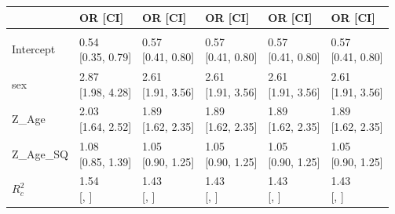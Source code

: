 \documentclass[]{article}
\begin{document}
\begin{table}[H]
\centering
\begin{tabular}{llllll}
\toprule
 & OR [CI] & OR [CI] & OR [CI] & OR [CI] & OR [CI]\\
\midrule
\addlinespace[0.3em]
\multicolumn{6}{l}{\textbf{Fixed}}\\
\hspace{1em}Intercept & \makecell{0.54 \\ {[0.35, 0.79]}} & \makecell{0.57 \\ {[0.41, 0.80]}} & \makecell{0.57 \\ {[0.41, 0.80]}} & \makecell{0.57 \\ {[0.41, 0.80]}} & \makecell{0.57 \\ {[0.41, 0.80]}}\\
\hspace{1em}sex & \makecell{2.87 \\ {[1.98, 4.28]}} & \makecell{2.61 \\ {[1.91, 3.56]}} & \makecell{2.61 \\ {[1.91, 3.56]}} & \makecell{2.61 \\ {[1.91, 3.56]}} & \makecell{2.61 \\ {[1.91, 3.56]}}\\
\hspace{1em}Z\_Age & \makecell{2.03 \\ {[1.64, 2.52]}} & \makecell{1.89 \\ {[1.62, 2.35]}} & \makecell{1.89 \\ {[1.62, 2.35]}} & \makecell{1.89 \\ {[1.62, 2.35]}} & \makecell{1.89 \\ {[1.62, 2.35]}}\\
\hspace{1em}Z\_Age\_SQ & \makecell{1.08 \\ {[0.85, 1.39]}} & \makecell{1.05 \\ {[0.90, 1.25]}} & \makecell{1.05 \\ {[0.90, 1.25]}} & \makecell{1.05 \\ {[0.90, 1.25]}} & \makecell{1.05 \\ {[0.90, 1.25]}}\\
$R^2_c$ & \makecell{1.54 \\ {[, ]}} & \makecell{1.43 \\ {[, ]}} & \makecell{1.43 \\ {[, ]}} & \makecell{1.43 \\ {[, ]}} & \makecell{1.43 \\ {[, ]}}\\

\end{tabular}
\end{table}
\end{document}
